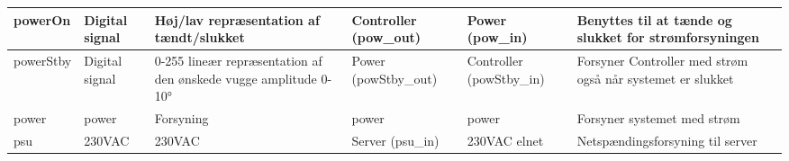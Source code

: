 \begin{table}[H]
\begin{small}
\begin{tabular}{|p{2cm}|p{2cm}|p{2cm}|p{2cm}|p{2cm}|p{}|}
powerOn			&Digital signal				&Høj/lav repræsentation af tændt/slukket 
&Controller (pow\_out) 			&Power (pow\_in)	&Benyttes til at tænde og slukket for strømforsyningen   				\\\hline

powerStby		&Digital signal 				&0-255 lineær repræsentation af den ønskede vugge amplitude 0-10°   &Power (powStby\_out)			&Controller (powStby\_in)	& Forsyner Controller med strøm også når systemet er slukket   				\\\hline

power			&power 				&Forsyning
&power 			&power				&Forsyner systemet med strøm   				\\\hline

psu				&230VAC 				&230VAC
&Server 	(psu\_in)	&230VAC elnet			&Netspændingsforsyning til server   				\\\hline

\end{tabular}
\end{small}
\label{table:Signaltabel}
\end{table}